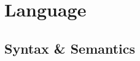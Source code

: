 \documentclass[mathserif,10pt]{beamer}
\begin{document}
\section{Language}
\subsection{Syntax \& Semantics}
\frame
{
  \begin{figure}[h]
  \centering
  \end{figure}
}
\frame
{
  \begin{figure}[h]
  \centering
  \end{figure}
}
\frame
{
  \begin{figure}[h]
  \centering
  \end{figure}
}
\end{document}
